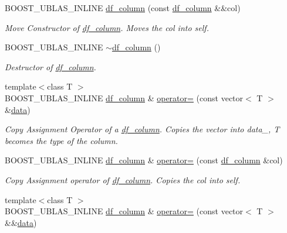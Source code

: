 \begin{DoxyCompactItemize}
B\+O\+O\+S\+T\+\_\+\+U\+B\+L\+A\+S\+\_\+\+I\+N\+L\+I\+NE \hyperlink{classboost_1_1numeric_1_1ublas_1_1df__column_a1f109572203e8944ecf51b122cfa0fe5}{df\+\_\+column} (const \hyperlink{classboost_1_1numeric_1_1ublas_1_1df__column}{df\+\_\+column} \&\&col)
\begin{DoxyCompactList}\small\item\em Move Constructor of \hyperlink{classboost_1_1numeric_1_1ublas_1_1df__column}{df\+\_\+column}. Moves the col into self. \end{DoxyCompactList}\item 
B\+O\+O\+S\+T\+\_\+\+U\+B\+L\+A\+S\+\_\+\+I\+N\+L\+I\+NE \hyperlink{classboost_1_1numeric_1_1ublas_1_1df__column_a64f7cfd401d7f3706dd1e5974c3a270b}{$\sim$df\+\_\+column} ()
\begin{DoxyCompactList}\small\item\em Destructor of \hyperlink{classboost_1_1numeric_1_1ublas_1_1df__column}{df\+\_\+column}. \end{DoxyCompactList}\item 
{\footnotesize template$<$class T $>$ }\\B\+O\+O\+S\+T\+\_\+\+U\+B\+L\+A\+S\+\_\+\+I\+N\+L\+I\+NE \hyperlink{classboost_1_1numeric_1_1ublas_1_1df__column}{df\+\_\+column} \& \hyperlink{classboost_1_1numeric_1_1ublas_1_1df__column_a8d2b21028a35021c4190938d81441148}{operator=} (const vector$<$ T $>$ \&\hyperlink{classboost_1_1numeric_1_1ublas_1_1df__column_ae8691246ec130db7ac17d784de562044}{data})
\begin{DoxyCompactList}\small\item\em Copy Assignment Operator of a \hyperlink{classboost_1_1numeric_1_1ublas_1_1df__column}{df\+\_\+column}. Copies the vector into data\+\_\+, T becomes the type of the column. \end{DoxyCompactList}\item 
B\+O\+O\+S\+T\+\_\+\+U\+B\+L\+A\+S\+\_\+\+I\+N\+L\+I\+NE \hyperlink{classboost_1_1numeric_1_1ublas_1_1df__column}{df\+\_\+column} \& \hyperlink{classboost_1_1numeric_1_1ublas_1_1df__column_ac9a89d21e7f3590aa54d6fe911fae4a3}{operator=} (const \hyperlink{classboost_1_1numeric_1_1ublas_1_1df__column}{df\+\_\+column} \&col)
\begin{DoxyCompactList}\small\item\em Copy Assignment operator of \hyperlink{classboost_1_1numeric_1_1ublas_1_1df__column}{df\+\_\+column}. Copies the col into self. \end{DoxyCompactList}\item 
{\footnotesize template$<$class T $>$ }\\B\+O\+O\+S\+T\+\_\+\+U\+B\+L\+A\+S\+\_\+\+I\+N\+L\+I\+NE \hyperlink{classboost_1_1numeric_1_1ublas_1_1df__column}{df\+\_\+column} \& \hyperlink{classboost_1_1numeric_1_1ublas_1_1df__column_a0ee61d44f4a77bfd5704bab9cbad240c}{operator=} (const vector$<$ T $>$ \&\&\hyperlink{classboost_1_1numeric_1_1ublas_1_1df__column_ae8691246ec130db7ac17d784de562044}{data})

\end{DoxyCompactItemize}
